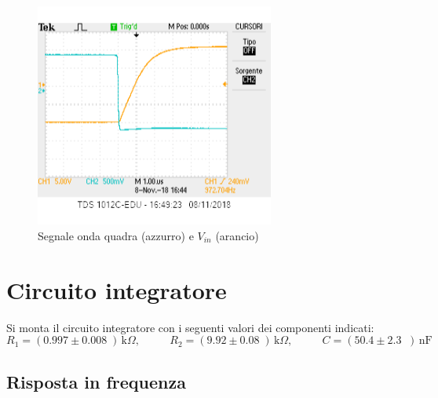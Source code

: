 \documentclass[10pt,a4paper]{article}
\newcommand{\exn}{\phantom{xxx}}
\begin{document}
\begin{figure}[h]
		\begin{center}
			
			\includegraphics[width=0.7\textwidth]{slewrate}
			\caption{\small Segnale onda quadra (azzurro) e $V_{in}$ (arancio)}
			\label{fig:Slew  Rate}
		\end{center}
	\end{figure}

\clearpage
	\section{Circuito integratore}
	Si monta il circuito integratore con i seguenti valori  dei componenti indicati: 
	\[
	R_1 = (0.997 \pm 0.008 \;) \,\mathrm{k}\Omega, \:\:\;\:\exn 
	R_2 = (9.92 \pm 0.08 \;) \,\mathrm{k}\Omega, \:\:\;\:\exn 
	C = (50.4 \pm 2.3 \;\;)\,\mathrm{nF}
	\]
	
	\subsection{Risposta in frequenza}
	
\end{document}
